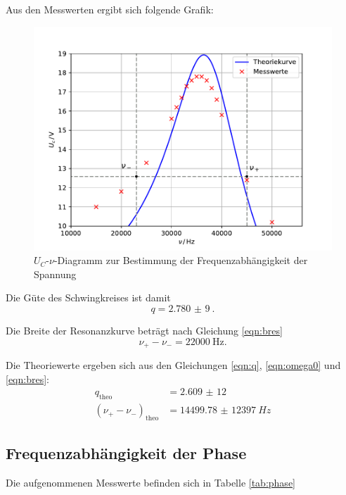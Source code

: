 Aus den Messwerten ergibt sich folgende Grafik:

\begin{figure}[H]
  \centering
  \includegraphics[width=\textwidth]{Plots/freq.pdf}
  \caption{$U_C$-$\nu$-Diagramm zur Bestimmung der Frequenzabhängigkeit der Spannung}
  \label{fig:freq}
\end{figure}

Die Güte des Schwingkreises ist damit
\begin{equation*}
  q = \SI{2,780(9)}{}.
\end{equation*}

Die Breite der Resonanzkurve beträgt nach Gleichung \eqref{eqn:bres}
\begin{equation*}
  \nu_+ - \nu_- = \SI{22000}{\Hz}.
\end{equation*}

Die Theoriewerte ergeben sich aus den Gleichungen \eqref{eqn:q}, \eqref{eqn:omega0} und \eqref{eqn:bres}:
\begin{align*}
  q_{\text{theo}} &= \SI{2,609(12)}{} \\
  (\nu_+ - \nu_-)_{\text{theo}} &= \SI{14499,78(12397)}{Hz}
\end{align*}

\subsection{Frequenzabhängigkeit der Phase}

Die aufgenommenen Messwerte befinden sich in Tabelle \ref{tab:phase}

